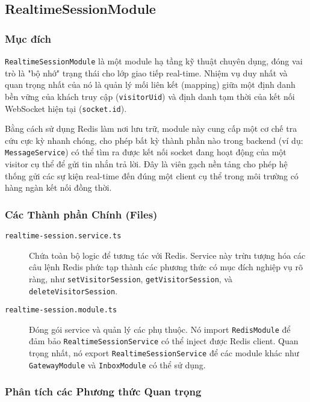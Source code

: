 \subsection{RealtimeSessionModule}
\label{subsec:realtimesession-module}

\subsubsection{Mục đích}

\texttt{RealtimeSessionModule} là một module hạ tầng kỹ thuật chuyên dụng, đóng vai trò là "bộ nhớ" trạng thái cho lớp giao tiếp real-time. Nhiệm vụ duy nhất và quan trọng nhất của nó là quản lý mối liên kết (mapping) giữa một định danh bền vững của khách truy cập (\texttt{visitorUid}) và định danh tạm thời của kết nối WebSocket hiện tại (\texttt{socket.id}).

Bằng cách sử dụng Redis làm nơi lưu trữ, module này cung cấp một cơ chế tra cứu cực kỳ nhanh chóng, cho phép bất kỳ thành phần nào trong backend (ví dụ: \texttt{MessageService}) có thể tìm ra được kết nối socket đang hoạt động của một visitor cụ thể để gửi tin nhắn trả lời. Đây là viên gạch nền tảng cho phép hệ thống gửi các sự kiện real-time đến đúng một client cụ thể trong môi trường có hàng ngàn kết nối đồng thời.

\subsubsection{Các Thành phần Chính (Files)}

\begin{description}
    \item[\texttt{realtime-session.service.ts}] Chứa toàn bộ logic để tương tác với Redis. Service này trừu tượng hóa các câu lệnh Redis phức tạp thành các phương thức có mục đích nghiệp vụ rõ ràng, như \texttt{setVisitorSession}, \texttt{getVisitorSession}, và \texttt{deleteVisitorSession}.
    
    \item[\texttt{realtime-session.module.ts}] Đóng gói service và quản lý các phụ thuộc. Nó import \texttt{RedisModule} để đảm bảo \texttt{RealtimeSessionService} có thể inject được Redis client. Quan trọng nhất, nó export \texttt{RealtimeSessionService} để các module khác như \texttt{GatewayModule} và \texttt{InboxModule} có thể sử dụng.
\end{description}

\subsubsection{Phân tích các Phương thức Quan trọng}

